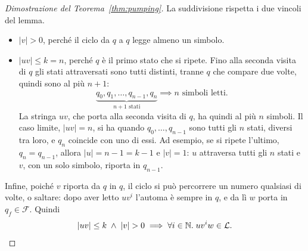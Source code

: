 \documentclass[a4paper, 11pt, oneside]{book}
\theoremstyle{formale}
\begin{document}
\begin{proof}[Dimostrazione del Teorema~\ref{thm:pumping}]
        La suddivisione rispetta i due vincoli del lemma.
        \begin{itemize}
            \item $|v| > 0$, perch\'e il ciclo da $q$ a $q$ legge almeno un simbolo.
            \item $|uv| \leq k = n$, perch\'e $q$ \`e il primo stato che si ripete. Fino
                alla seconda visita di $q$ gli stati attraversati sono tutti distinti,
                tranne $q$ che compare due volte, quindi sono al pi\`u $n + 1$:
                \begin{equation*}
                    \underbrace{q_0, q_1, \dots, q_{n-1}, q_n}_{n + 1 \text{ stati}}
                    \implies n \text{ simboli letti}.
                \end{equation*}
                La stringa $uv$, che porta alla seconda visita di $q$, ha quindi al pi\`u
                $n$ simboli. Il caso limite, $|uv| = n$, si ha quando
                $q_0, \dots, q_{n-1}$ sono tutti gli $n$ stati, diversi tra loro, e $q_n$
                coincide con uno di essi. Ad esempio, se si ripete l'ultimo,
                $q_n = q_{n-1}$, allora $|u| = n - 1 = k - 1$ e $|v| = 1$: $u$ attraversa
                tutti gli $n$ stati e $v$, con un solo simbolo, riporta in $q_{n-1}$.
        \end{itemize}
        Infine, poich\'e $v$ riporta da $q$ in $q$, il ciclo si pu\`o percorrere un
        numero qualsiasi di volte, o saltare: dopo aver letto $uv^i$ l'automa \`e sempre
        in $q$, e da l\`i $w$ porta in $q_f \in \mathcal{F}$. Quindi
        \begin{equation*}
            |uv| \leq k \;\land\; |v| > 0 \implies
            \forall i \in \mathbb{N}.\; uv^i w \in \mathcal{L}. \qedhere
        \end{equation*}
    \end{proof}
\end{document}
